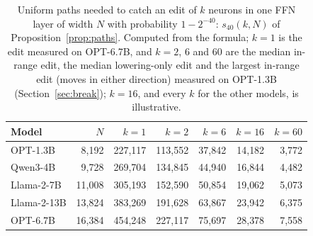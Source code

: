 \begin{table}[t]
  \caption{Uniform paths needed to catch an edit of $k$ neurons in one FFN layer of width $N$ with
  probability $1-2^{-40}$: $s_{40}(k,N)$ of Proposition~\ref{prop:paths}. Computed from the formula;
  $k=1$ is the edit measured on OPT-6.7B, and $k=2$, $6$ and $60$ are the median in-range edit, the
  median lowering-only edit and the largest in-range edit (moves in either direction) measured on
  OPT-1.3B (Section~\ref{sec:break}); $k=16$, and every $k$ for the other models, is illustrative.}
  \label{tab:paths}
  \centering\footnotesize
  \setlength{\tabcolsep}{3.5pt}
  \begin{tabular}{@{}lrrrrrr@{}}
    \toprule
    Model & $N$ & $k=1$ & $k=2$ & $k=6$ & $k=16$ & $k=60$ \\
    \midrule
    OPT-1.3B    &  8{,}192 & 227{,}117 & 113{,}552 & 37{,}842 & 14{,}182 & 3{,}772 \\
    Qwen3-4B    &  9{,}728 & 269{,}704 & 134{,}845 & 44{,}940 & 16{,}844 & 4{,}482 \\
    Llama-2-7B  & 11{,}008 & 305{,}193 & 152{,}590 & 50{,}854 & 19{,}062 & 5{,}073 \\
    Llama-2-13B & 13{,}824 & 383{,}269 & 191{,}628 & 63{,}867 & 23{,}942 & 6{,}375 \\
    OPT-6.7B    & 16{,}384 & 454{,}248 & 227{,}117 & 75{,}697 & 28{,}378 & 7{,}558 \\
    \bottomrule
  \end{tabular}
\end{table}

